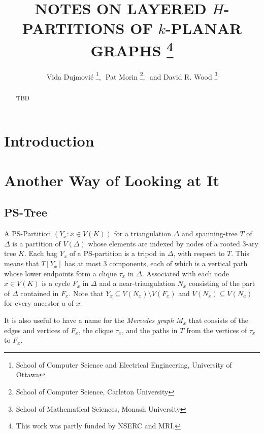 \documentclass{patmorin}
\title{\MakeUppercase{Notes on Layered $H$-Partitions of $k$-Planar Graphs}%
    \thanks{This work was partly funded by NSERC and MRI.}}
\author{Vida Dujmovi\'c%
        \thanks{School of Computer Science and Electrical Engineering,
                University of Ottawa},\,\,
        Pat Morin%
        \thanks{School of Computer Science, Carleton University},\,\, and
        David R. Wood%
        \thanks{School of Mathematical Sciences, Monash University}}
\begin{document}
\maketitle


\begin{abstract}
  TBD
\end{abstract}

\section{Introduction}



\section{Another Way of Looking at It}

\subsection{PS-Tree}

A PS-Partition $(Y_x:x\in V(K))$ for a triangulation $\Delta$ and spanning-tree $T$ of $\Delta$ is a partition of $V(\Delta)$ whose elements are indexed by nodes of a rooted 3-ary tree $K$.  Each bag $Y_x$ of a PS-partition is a tripod in $\Delta$, with respect to $T$.  This means that $T[Y_x]$ has at most 3 components, each of which is a vertical path whose lower endpoints form a clique $\tau_x$ in $\Delta$.  Associated with each node $x\in V(K)$ is a cycle $F_x$ in $\Delta$ and a near-triangulation $N_x$ consisting of the part of $\Delta$ contained in $F_x$.  Note that $Y_x\subseteq V(N_x)\setminus V(F_x)$ and $V(N_x)\subseteq V(N_a)$ for every ancestor $a$ of $x$.

It is also useful to have a name for the \emph{Mercedes graph} $M_x$ that consists of the edges and vertices of $F_x$, the clique $\tau_x$, and the paths in $T$ from the vertices of $\tau_x$ to $F_x$.
\end{document}
